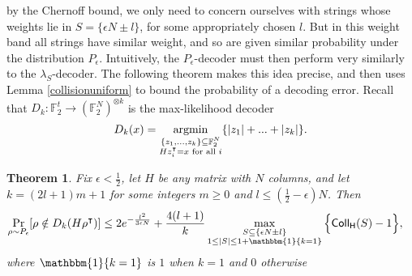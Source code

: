 \documentclass[12pt]{article}
\newtheorem{theorem}{Theorem}
\newcommand{\F}{\mathbb{F}}
\begin{document}
by the Chernoff bound, we only need to concern ourselves with strings whose weights lie in $S=\{\epsilon N\pm l\}$, for some appropriately chosen $l$. But in this weight band all strings have similar weight, and so are given similar probability under the distribution $P_\epsilon$. Intuitively, the $P_\epsilon$-decoder must then perform very similarly to the $\lambda_S$-decoder. The following theorem makes this idea precise, and then uses Lemma \ref{collisionuniform} to bound the probability of a decoding error. Recall that $D_k:\F_2^t\rightarrow(\F_2^N)^{\otimes k}$ is the max-likelihood decoder $$D_k(x)=\mathop{\textnormal{argmin}}_{\substack{\{z_1,...,z_k\}\subseteq \mathbb{F}_2^N\\Hz_i^\intercal=x \textnormal{ for all }i}}\{|z_1|+...+|z_k|\}.$$

\begin{theorem}\label{collisiondecoding}
Fix $\epsilon <\frac{1}{2}$, let $H$ be any matrix with $N$ columns, and let $k=(2l+1)m +1$ for some integers $m \geq0$ and $l\leq (\frac{1}{2}-\epsilon)N$. Then
\begin{align*}
    \Pr_{\rho\sim P_\epsilon}[\rho\notin D_k(H\rho^\intercal)]&\leq 2e^{-\frac{l^2}{3\epsilon N}} +\frac{4(l+1)}{k} \mathop{\max}_{\substack{S\subseteq \{\epsilon N\pm l\} \\
    1\leq|S|\leq 1+\mathbbm{1}\{k=1\}}} \Big\{ \mathsf{Coll_H}(S)-1 \Big\},
\end{align*}
where $\mathbbm{1}\{k=1\}$ is $1$ when $k=1$ and $0$ otherwise
\end{theorem}
\end{document}
